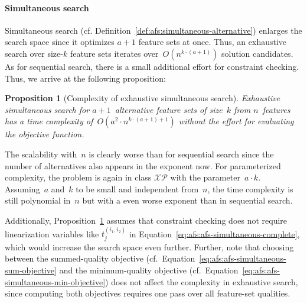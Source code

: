 \documentclass{article}
\newtheorem{proposition}[corollary]{Proposition} %
\theoremstyle{definition}
\begin{document}
\paragraph{Simultaneous search}

Simultaneous search (cf. Definition~\ref{def:afs:simultaneous-alternative}) enlarges the search space since it optimizes $a+1$ feature sets at once.
Thus, an exhaustive search over size-$k$ feature sets iterates over~$O(n^{k \cdot (a+1)})$ solution candidates.
As for sequential search, there is a small additional effort for constraint checking.
Thus, we arrive at the following proposition:
%
\begin{proposition}[Complexity of exhaustive simultaneous search]
	Exhaustive simultaneous search for $a + 1$~alternative feature sets of size~$k$ from $n$~features has a time complexity of~$O(a^2 \cdot n^{k \cdot (a+1) + 1})$ without the effort for evaluating the objective function.
	\label{prop:afs:complexity-exhaustive-simultaneuos}
\end{proposition}
%
The scalability with~$n$ is clearly worse than for sequential search since the number of alternatives also appears in the exponent now.
For parameterized complexity, the problem is again in class $\mathcal{XP}$ with the parameter~$a \cdot k$.
Assuming~$a$ and~$k$ to be small and independent from~$n$, the time complexity is still polynomial in~$n$ but with a even worse exponent than in sequential search.

Additionally, Proposition~\ref{prop:afs:complexity-exhaustive-simultaneuos} assumes that constraint checking does not require linearization variables like $t^{(i_1,i_2)}_j$ in Equation~\ref{eq:afs:afs-simultaneous-complete}, which would increase the search space even further.
Further, note that choosing between the summed-quality objective (cf.~Equation~\ref{eq:afs:afs-simultaneous-sum-objective} and the minimum-quality objective (cf.~Equation~\ref{eq:afs:afs-simultaneous-min-objective}) does not affect the complexity in exhaustive search, since computing both objectives requires one pass over all feature-set qualities.
\end{document}
